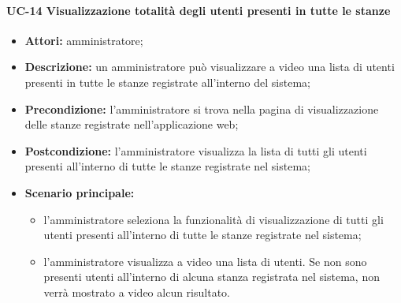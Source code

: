 \paragraph{UC-14 Visualizzazione totalità degli utenti presenti in tutte le stanze}
\begin{itemize}
    \item \textbf{Attori:} amministratore;
    \item \textbf{Descrizione:} un amministratore pu\`{o} visualizzare a video una lista di utenti presenti in tutte le stanze registrate all'interno del sistema;
    \item \textbf{Precondizione:} l'amministratore si trova nella pagina di visualizzazione delle stanze registrate nell'applicazione web;
    \item \textbf{Postcondizione:} l'amministratore visualizza la lista di tutti gli utenti presenti all'interno di tutte le stanze registrate nel sistema;
    \item \textbf{Scenario principale:}
    \begin{itemize}
        \item l'amministratore seleziona la funzionalità di visualizzazione di tutti gli utenti presenti all'interno di tutte le stanze registrate nel sistema;
        \item l'amministratore visualizza a video una lista di utenti. Se non sono presenti utenti all'interno di alcuna stanza registrata nel sistema, non verrà mostrato a video alcun risultato.
    \end{itemize}
\end{itemize}

